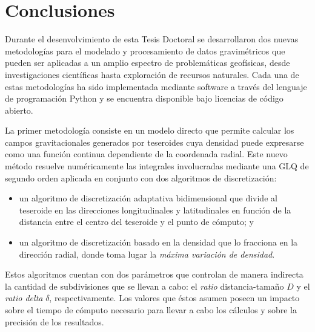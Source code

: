 \chapter{Conclusiones}

Durante el desenvolvimiento de esta Tesis Doctoral se desarrollaron dos nuevas
metodologías para el modelado y procesamiento de datos gravimétricos que pueden
ser aplicadas a un amplio espectro de problemáticas geofísicas,
desde investigaciones científicas hasta exploración de recursos
naturales.
Cada una de estas metodologías ha sido implementada mediante software a través
del lenguaje de programación Python y se encuentra disponible bajo licencias
de código abierto.

\vspace{1em}

La primer metodología consiste en un modelo directo que permite calcular los
campos gravitacionales generados por teseroides cuya densidad puede expresarse
como una función continua dependiente de la coordenada radial.
Este nuevo método resuelve numéricamente las integrales involucradas mediante
una \acl{GLQ} de segundo orden aplicada en conjunto con dos algoritmos de
discretización:
%
\begin{itemize}
    \item un algoritmo de discretización adaptativa bidimensional que divide al
        teseroide en las direcciones longitudinales y latitudinales en función
        de la distancia entre el centro del teseroide y el punto de cómputo; y
    \item  un algoritmo de discretización basado en la densidad que lo
        fracciona en la dirección radial, donde toma lugar la \emph{máxima
        variación de densidad}.
\end{itemize}

Estos algoritmos cuentan con dos parámetros que controlan de manera indirecta
la cantidad de subdivisiones que se llevan a cabo: el \emph{ratio}
distancia-tamaño $D$ y el \emph{ratio delta} $\delta$, respectivamente.
Los valores que éstos asumen poseen un impacto sobre el tiempo de cómputo
necesario para llevar a cabo los cálculos y sobre la precisión de los
resultados.


